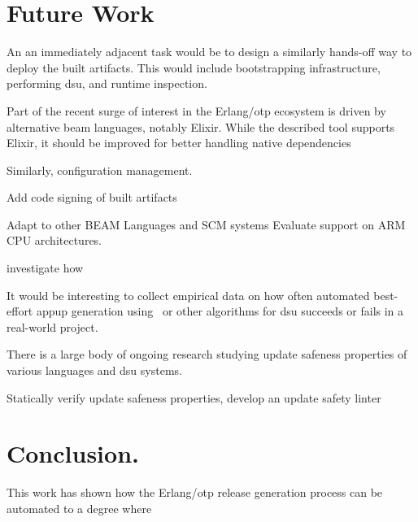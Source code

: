 \cleardoublepage
\section{Future Work}

An an immediately adjacent task would be to design a similarly hands-off way to deploy the built artifacts. This would include bootstrapping infrastructure, performing \acrshort{dsu}, and runtime inspection.

Part of the recent surge of interest in the Erlang/\acrshort{otp} ecosystem is driven by alternative \acrshort{beam} languages, notably Elixir. While the described tool supports Elixir, it should be improved for better handling native dependencies



Similarly, configuration management.


Add code signing of built artifacts

Adapt to other BEAM Languages and SCM systems
Evaluate support on ARM CPU architectures.


investigate how

It would be interesting to collect empirical data on how often automated best-effort \acrshort{appup} generation using~\cite{rebar3appup} or other algorithms for \acrshort{dsu} succeeds or fails in a real-world project.

There is a large body of ongoing research studying update safeness properties of various languages and \acrshort{dsu} systems.

Statically verify update safeness properties, develop an update safety linter

\cleardoublepage
\section{Conclusion.}

This work has shown how the Erlang/\acrshort{otp} release generation process can be automated to a degree where

